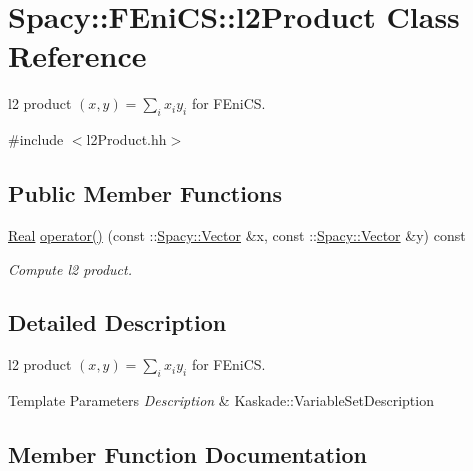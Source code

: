 \hypertarget{classSpacy_1_1FEniCS_1_1l2Product}{}\section{Spacy\+:\+:F\+Eni\+C\+S\+:\+:l2\+Product Class Reference}
\label{classSpacy_1_1FEniCS_1_1l2Product}


l2 product $(x,y) = \sum_i x_i y_i $ for F\+Eni\+C\+S.  




{\ttfamily \#include $<$l2\+Product.\+hh$>$}

\subsection*{Public Member Functions}
\begin{DoxyCompactItemize}
\item 
\hyperlink{classSpacy_1_1Real}{Real} \hyperlink{classSpacy_1_1FEniCS_1_1l2Product_a795fc0d8cbced556168163265ac21406_a795fc0d8cbced556168163265ac21406}{operator()} (const \+::\hyperlink{classSpacy_1_1Vector}{Spacy\+::\+Vector} \&x, const \+::\hyperlink{classSpacy_1_1Vector}{Spacy\+::\+Vector} \&y) const 
\begin{DoxyCompactList}\small\item\em Compute l2 product. \end{DoxyCompactList}\end{DoxyCompactItemize}


\subsection{Detailed Description}
l2 product $(x,y) = \sum_i x_i y_i $ for F\+Eni\+C\+S. 


\begin{DoxyTemplParams}{Template Parameters}
{\em Description} & Kaskade\+::\+Variable\+Set\+Description \\
\hline
\end{DoxyTemplParams}


\subsection{Member Function Documentation}
\hypertarget{classSpacy_1_1FEniCS_1_1l2Product_a795fc0d8cbced556168163265ac21406_a795fc0d8cbced556168163265ac21406}{}
